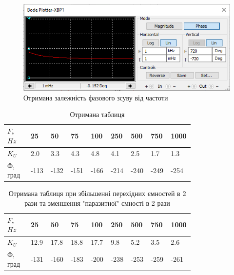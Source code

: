 \documentclass{article}
\begin{document}
\begin{normalsize}
	\begin{figure}[H]
		\centering
		\includegraphics[width=\textwidth]{15}
		\caption{Отримана залежність фазового зсуву від частоти}
	\end{figure}
	
	\begin{table}[H]
		\centering
		\renewcommand*\arraystretch{1.3}
		\begin{tabular}{|p{0.12\linewidth}|p{0.08\linewidth}|p{0.08\linewidth}|p{0.08\linewidth}|p{0.08\linewidth}|p{0.08\linewidth}|p{0.08\linewidth}|p{0.08\linewidth}|p{0.08\linewidth}|}
			\hline
			$F$, $Hz$&25&50&75&100&250&500&750&1000\\
			\hline
			$K_U$&2.0&3.3&4.3&4.8&4.1&2.5&1.7&1.3\\
			\hline
			Ф, град&-113&-132&-151&-166&-214&-240&-249&-254\\
			\hline
		\end{tabular}
		\caption{Отримана таблиця}
	\end{table}
	
	\begin{table}[H]
		\centering
		\renewcommand*\arraystretch{1.3}
		\begin{tabular}{|p{0.12\linewidth}|p{0.08\linewidth}|p{0.08\linewidth}|p{0.08\linewidth}|p{0.08\linewidth}|p{0.08\linewidth}|p{0.08\linewidth}|p{0.08\linewidth}|p{0.08\linewidth}|}
			\hline
			$F$, $Hz$&25&50&75&100&250&500&750&1000\\
			\hline
			$K_U$&12.9&17.8&18.8&17.7&9.8&5.2&3.5&2.6\\
			\hline
			Ф, град&-131&-160&-183&-200&-238&-253&-259&-261\\
			\hline
		\end{tabular}
		\caption{Отримана таблиця при збільшенні перехідних ємностей в 2 рази та зменшення "паразитної" ємності в 2 рази}
	\end{table}
	

\end{normalsize}
\end{document}
